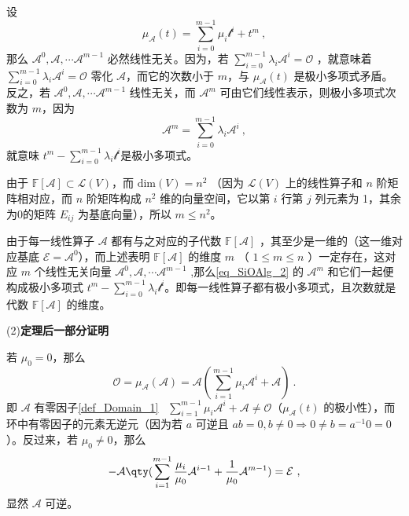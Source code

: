 设
\begin{equation}
\mu_\mathcal{A}(t)=\sum_{i=0}^{m-1}\mu_i\mathcal t^i+t^m~,
\end{equation}
那么 $\mathcal{A}^0,\mathcal{A},\cdots \mathcal{A}^{m-1}$ 必然线性无关。因为，若 $\sum\limits_{i=0}^{m-1}\lambda_i\mathcal{A}^i=\mathcal{O}$ ，就意味着 $\sum\limits_{i=0}^{m-1}\lambda_i\mathcal{A}^i=\mathcal{O}$ 零化 $\mathcal A$，而它的次数小于 $m$，与 $\mu_\mathcal{A}(t)$ 是极小多项式矛盾。反之，若 $\mathcal{A}^0,\mathcal{A},\cdots \mathcal{A}^{m-1}$ 线性无关，而 $\mathcal{A}^m$ 可由它们线性表示，则极小多项式次数为 $m$，因为
\begin{equation}\label{eq_SiOAlg_2}
\mathcal A^m=\sum_{i=0}^{m-1}\lambda_i\mathcal A^i~,
\end{equation}
就意味 $t^m-\sum\limits_{i=0}^{m-1}\lambda_i\mathcal t^i$是极小多项式。

由于 $\mathbb{F}[\mathcal{A}]\subset\mathcal{L}(V)$，而 $\mathrm{dim}(V)=n^2$ （因为 $\mathcal{L}(V)$ 上的线性算子和 $n$ 阶矩阵相对应，而 $n$ 阶矩阵构成 $n^2$ 维的向量空间，它以第 $i$ 行第 $j$ 列元素为 1，其余为0的矩阵 $E_{ij}$ 为基底向量），所以 $m\leq n^2$。

由于每一线性算子 $\mathcal A$ 都有与之对应的子代数 $\mathbb{F}[\mathcal A]$ ，其至少是一维的（这一维对应基底 $\mathcal{E=A}^0$），而上述表明 $\mathbb{F}[\mathcal A]$ 的维度 $m$ （ $1\leq m\leq n$ ）一定存在，这对应 $m$ 个线性无关向量 $\mathcal{A}^0,\mathcal{A},\cdots \mathcal{A}^{m-1}$ ,那么\autoref{eq_SiOAlg_2} 的 $\mathcal A^m$ 和它们一起便构成极小多项式 $t^m-\sum\limits_{i=0}^{m-1}\lambda_i\mathcal t^i$。即每一线性算子都有极小多项式，且次数就是代数 $\mathbb{F}[\mathcal{A}]$ 的维度。

(2)\textbf{定理后一部分证明}

若 $\mu_0= 0$，那么
\begin{equation}
\mathcal O=\mu_\mathcal{A}(\mathcal A)=\mathcal A(\sum_{i=1}^{m-1}\mu_i\mathcal A^i+\mathcal{A})~.
\end{equation}
即 $\mathcal{A}$ 有零因子\autoref{def_Domain_1}~ $\sum\limits_{i=1}^{m-1}\mu_i\mathcal A^i+\mathcal{A}\neq \mathcal O$（$\mu_\mathcal{A}(t)$ 的极小性），而环中有零因子的元素无逆元（因为若 $a$ 可逆且 $ab=0,b\neq 0\Rightarrow 0\neq b=a^{-1}0=0$）。反过来，若 $\mu_0\neq0$，那么
\begin{equation}
-\mathcal{A}\qty(\sum_{i=1}^{m-1}\frac{\mu_i}{\mu_0}\mathcal A^{i-1}+\frac{1}{\mu_0}\mathcal A^{m-1})=\mathcal{E}~,
\end{equation}
显然 $\mathcal{A}$ 可逆。

